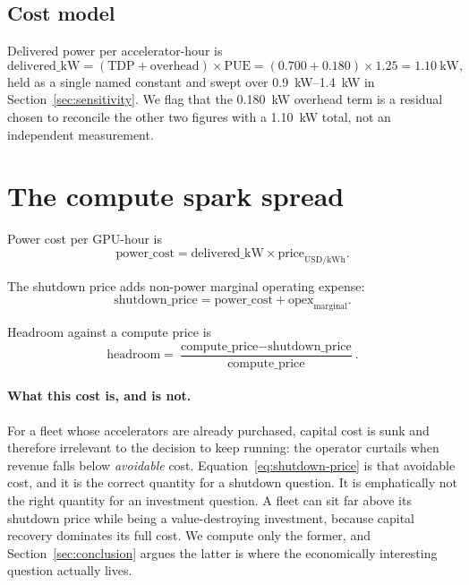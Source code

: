 \documentclass[11pt]{article}
\begin{document}
\subsection{Cost model}

Delivered power per accelerator-hour is
\begin{equation}
  \label{eq:delivered-kw}
  \text{delivered\_kW} = (\text{TDP} + \text{overhead}) \times \text{PUE}
  = (0.700 + 0.180) \times 1.25 = \SI{1.10}{\kilo\watt},
\end{equation}
held as a single named constant and swept over
\SIrange{0.9}{1.4}{\kilo\watt} in Section~\ref{sec:sensitivity}. We flag
that the \SI{0.180}{\kilo\watt} overhead term is a residual chosen to
reconcile the other two figures with a \SI{1.10}{\kilo\watt} total, not an
independent measurement.

\section{The compute spark spread}
\label{sec:spread}

Power cost per GPU-hour is
\begin{equation}
  \label{eq:power-cost}
  \text{power\_cost} = \text{delivered\_kW} \times \text{price}_{\text{USD/kWh}}.
\end{equation}

The shutdown price adds non-power marginal operating expense:
\begin{equation}
  \label{eq:shutdown-price}
  \text{shutdown\_price} = \text{power\_cost} + \text{opex}_{\text{marginal}}.
\end{equation}

Headroom against a compute price is
\begin{equation}
  \label{eq:headroom}
  \text{headroom} = \frac{\text{compute\_price} - \text{shutdown\_price}}
  {\text{compute\_price}}.
\end{equation}

\paragraph{What this cost is, and is not.} For a fleet whose accelerators
are already purchased, capital cost is sunk and therefore irrelevant to the
decision to keep running: the operator curtails when revenue falls below
\emph{avoidable} cost. Equation~\eqref{eq:shutdown-price} is that avoidable
cost, and it is the correct quantity for a shutdown question. It is
emphatically not the right quantity for an investment question. A fleet can
sit far above its shutdown price while being a value-destroying
investment, because capital recovery dominates its full cost. We compute
only the former, and Section~\ref{sec:conclusion} argues the latter is
where the economically interesting question actually lives.
\end{document}
